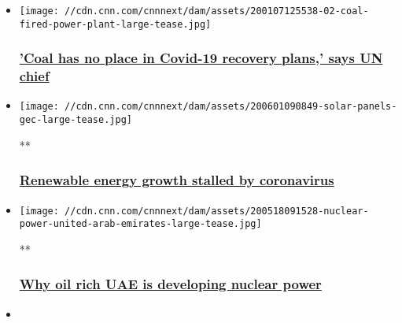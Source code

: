 \begin{itemize}
\item
  \href{/2020/07/09/energy/iea-clean-energy-transition-summit-spc-intl/index.html}{}

  \texttt{[image: //cdn.cnn.com/cnnnext/dam/assets/200107125538-02-coal-fired-power-plant-large-tease.jpg]}

  \hypertarget{coal-has-no-place-in-covid-19-recovery-plans-says-un-chief}{%
  \subsubsection{\texorpdfstring{\href{/2020/07/09/energy/iea-clean-energy-transition-summit-spc-intl/index.html}{'Coal
  has no place in Covid-19 recovery plans,' says UN
  chief}}{'Coal has no place in Covid-19 recovery plans,' says UN chief}}\label{coal-has-no-place-in-covid-19-recovery-plans-says-un-chief}}
\item
  \href{/videos/business/2020/06/01/renewable-energy-solar-wind-coronavirus-gec.cnn-business}{}

  \texttt{[image: //cdn.cnn.com/cnnnext/dam/assets/200601090849-solar-panels-gec-large-tease.jpg]}

  **

  \hypertarget{renewable-energy-growth-stalled-by-coronavirus}{%
  \subsubsection{\texorpdfstring{\href{/videos/business/2020/06/01/renewable-energy-solar-wind-coronavirus-gec.cnn-business}{Renewable
  energy growth stalled by
  coronavirus}}{Renewable energy growth stalled by coronavirus}}\label{renewable-energy-growth-stalled-by-coronavirus}}
\item
  \href{/videos/business/2020/05/18/nuclear-power-energy-united-arab-emirates.cnn-business}{}

  \texttt{[image: //cdn.cnn.com/cnnnext/dam/assets/200518091528-nuclear-power-united-arab-emirates-large-tease.jpg]}

  **

  \hypertarget{why-oil-rich-uae-is-developing-nuclear-power}{%
  \subsubsection{\texorpdfstring{\href{/videos/business/2020/05/18/nuclear-power-energy-united-arab-emirates.cnn-business}{Why
  oil rich UAE is developing nuclear
  power}}{Why oil rich UAE is developing nuclear power}}\label{why-oil-rich-uae-is-developing-nuclear-power}}
\item
  \href{/videos/business/2020/05/04/shipping-fuel-standards-environment-gec.cnn-business}{}


\end{itemize}
